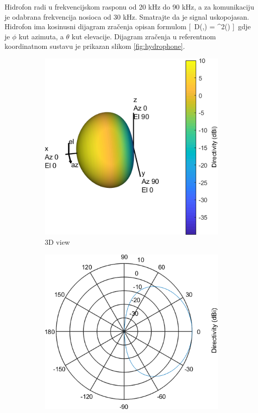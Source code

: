 Hidrofon radi u frekvencijskom rasponu od 20 kHz do 90 kHz, a za komunikaciju je odabrana frekvencija nosioca od 30 kHz. Smatrajte da je signal uskopojasan. Hidrofon ima kosinusni dijagram zračenja opisan formulom
[\ D(\phi,\theta) = \cos^2(\theta) ]\
gdje je $\phi$ kut azimuta, a $\theta$ kut elevacije. Dijagram zračenja u referentnom koordinatnom sustavu je prikazan slikom \ref{fig:hydrophone}.
\begin{figure}[h!]
   \centering
   \begin{subfigure}[b]{0.4\textwidth}
      \centering
      \includegraphics[width=\textwidth]{hydrophone_3d.png}
      \caption{3D view}
   \end{subfigure}
   \begin{subfigure}[b]{0.4\textwidth}
      \centering
      \includegraphics[width=\textwidth]{hydrophone_cut.png}

\end{subfigure}
\end{figure}
